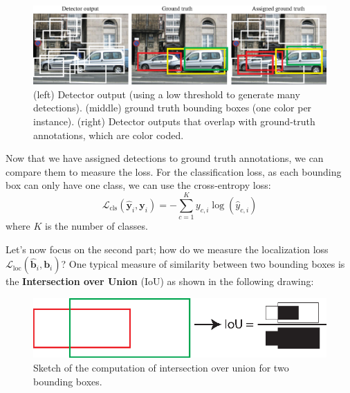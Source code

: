 \begin{figure}
\centerline{
\includegraphics[width=1\linewidth]{figures/object_recognition/detections.eps}
}
\caption{%
(left) Detector output (using a low threshold to generate many detections). (middle) ground truth bounding boxes (one color per instance). (right) Detector outputs that overlap with ground-truth annotations, which are color coded.}
\end{figure}

Now that we have assigned detections to ground truth annotations, we can compare them to measure the loss. For the classification loss, as each bounding box can only have one class, we can use the cross-entropy loss: 
\begin{equation}
    \mathcal{L}_{\text{cls}}(\hat{\mathbf{y}}_i, \mathbf{y}_i)
     = -  \sum_{c=1}^{K} y_{c,i} \log(\hat{y}_{c,i}) 
\end{equation}
where $K$ is the number of classes.  

Let's now focus on the second part; how do we measure the localization loss $\mathcal{L}_{\text{loc}} (\hat{\mathbf{b}}_i, \mathbf{b}_i)$? One typical measure of similarity between two bounding boxes is the {\bf Intersection over Union} (IoU) as shown in the following drawing:

\begin{figure}
\centerline{
\includegraphics[width=0.5\linewidth]{figures/object_recognition/iou.eps}
}
\caption{Sketch of the computation of intersection over union for two bounding boxes.}
\end{figure}

